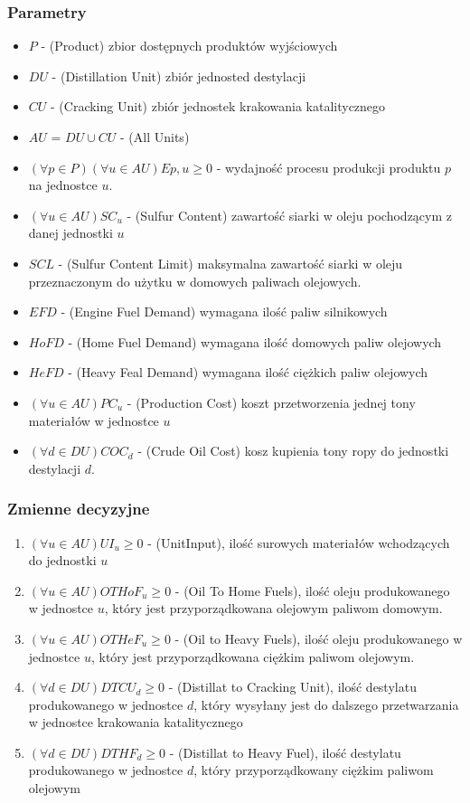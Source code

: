 \documentclass{article}
\begin{document}
\subsubsection{Parametry}
\begin{itemize}
    \item $P$ - (Product) zbior dostępnych produktów wyjściowych
    \item $DU$ - (Distillation Unit) zbiór jednosted destylacji
    \item $CU$ - (Cracking Unit) zbiór jednostek krakowania katalitycznego
    \item $AU$ = $DU \cup CU$ - (All Units)
    \item $ (\forall p \in P)(\forall u \in AU) E{p,u} \ge 0$ - wydajność procesu 
        produkcji produktu $p$ na jednostce $u$. 
    \item $ (\forall u \in AU)SC_u$ - (Sulfur Content) zawartość siarki w oleju pochodzącym z danej jednostki $u$
    \item $SCL$ - (Sulfur Content Limit) maksymalna zawartość siarki w oleju przeznaczonym do użytku
        w domowych paliwach olejowych.
    \item $EFD$ - (Engine Fuel Demand) wymagana ilość paliw silnikowych
    \item $HoFD$ - (Home Fuel Demand) wymagana ilość domowych paliw olejowych
    \item $HeFD$ - (Heavy Feal Demand) wymagana ilość ciężkich paliw olejowych
    \item $ (\forall u \in AU) PC_u $ - (Production Cost) koszt przetworzenia jednej tony materiałów w jednostce $u$
    \item $ (\forall d \in DU) COC_d $ - (Crude Oil Cost) kosz kupienia tony ropy do jednostki destylacji $d$.
\end{itemize}

\subsubsection{Zmienne decyzyjne}
\begin{enumerate}
    \item $(\forall u \in AU) UI_u \ge 0$ - (UnitInput), ilość surowych materiałów wchodzących do jednostki $u$
    \item $(\forall u \in AU) OTHoF_u \ge 0$ - (Oil To Home Fuels), ilość oleju produkowanego w jednostce $u$, który
        jest przyporządkowana olejowym paliwom domowym.
    \item $(\forall u \in AU) OTHeF_u \ge 0$ - (Oil to Heavy Fuels), ilość oleju produkowanego w jednostce $u$, który
        jest przyporządkowana ciężkim paliwom olejowym.
    \item $(\forall d \in DU) DTCU_d \ge 0$ - (Distillat to Cracking Unit), ilość destylatu produkowanego w jednostce $d$,
        który wysyłany jest do dalszego przetwarzania w jednostce krakowania katalitycznego
    \item $(\forall d \in DU) DTHF_d \ge 0$ - (Distillat to Heavy Fuel), ilość destylatu produkowanego w jednostce $d$,
        który przyporządkowany ciężkim paliwom olejowym
\end{enumerate}
\end{document}
